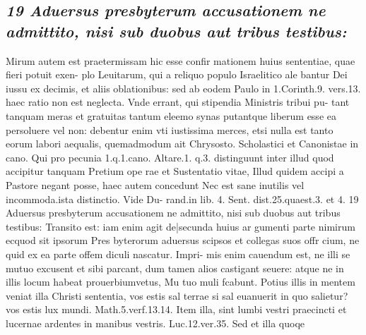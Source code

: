 \documentclass{article}
\begin{document}
\begin{pages}
\subsection*{\textit{19 Aduersus presbyterum accusationem ne admittito, nisi sub duobus aut tribus testibus:}}Mirum autem est praetermissam hic esse confir mationem huius sententiae, quae fieri potuit exen- plo Leuitarum, qui a reliquo populo Israelitico ale bantur Dei iussu ex decimis, et aliis oblationibus: sed ab eodem Paulo in 1.Corinth.9. vers.13. haec ratio non est neglecta. Vnde errant, qui stipendia Ministris tribui pu- tant tanquam meras et gratuitas tantum eleemo synas putantque liberum esse ea persoluere vel non: debentur enim vti iustissima merces, etsi nulla est tanto eorum labori aequalis, quemadmodum ait Chrysosto. Scholastici et Canonistae in cano. Qui pro pecunia 1.q.1.cano. Altare.1. q.3. distinguunt inter illud quod accipitur tanquam Pretium ope rae et Sustentatio vitae, Illud quidem accipi a Pastore negant posse, haec autem concedunt Nec est sane inutilis vel incommoda.ista distinctio. Vide Du- rand.in lib. 4. Sent. dist.25.quaest.3. et 4. 19 Aduersus presbyterum accusationem ne admittito, nisi sub duobus aut tribus testibus: Transito est: iam enim agit de|secunda huius ar gumenti parte nimirum ecquod sit ipsorum Pres byterorum aduersus scipsos et collegas suos offr cium, ne quid ex ea parte offem diculi nascatur. Impri- mis enim cauendum est, ne illi se mutuo excusent et sibi parcant, dum tamen alios castigant seuere: atque ne in illis locum habeat prouerbiumvetus, Mu tuo muli fcabunt. Potius illis in mentem veniat illa Christi sententia, vos estis sal terrae si sal euanuerit in quo salietur? vos estis lux mundi. Math.5.verf.13.14. Item illa, sint lumbi vestri praecincti et lucernae ardentes in manibus vestris. Luc.12.ver.35. Sed et illa quoqe  \pend

\end{pages}
\end{document}
